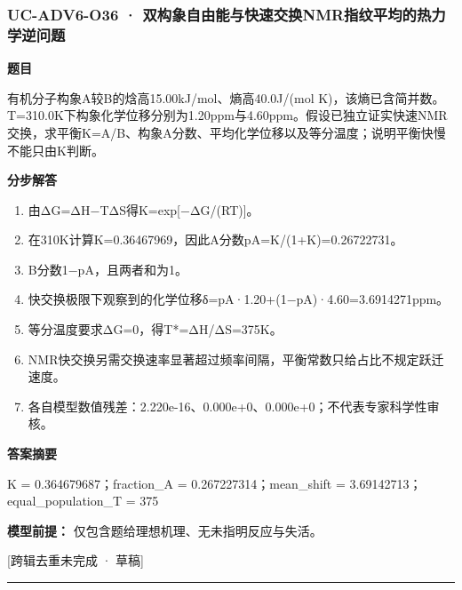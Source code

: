 \documentclass[UTF8,11pt,a4paper]{ctexart}
\begin{document}
\subsubsection*{UC-ADV6-O36 · 双构象自由能与快速交换NMR指纹平均的热力学逆问题}
\noindent\textbf{题目}\par
有机分子构象A较B的焓高15.00kJ/mol、熵高40.0J/(mol K)，该熵已含简并数。T=310.0K下构象化学位移分别为1.20ppm与4.60ppm。假设已独立证实快速NMR交换，求平衡K=A/B、构象A分数、平均化学位移以及等分温度；说明平衡快慢不能只由K判断。\par
\medskip\noindent\textbf{分步解答}
\begin{enumerate}
\item 由ΔG=ΔH−TΔS得K=exp[−ΔG/(RT)]。
\item 在310K计算K=0.36467969，因此A分数pA=K/(1+K)=0.26722731。
\item B分数1−pA，且两者和为1。
\item 快交换极限下观察到的化学位移δ=pA·1.20+(1−pA)·4.60=3.6914271ppm。
\item 等分温度要求ΔG=0，得T*=ΔH/ΔS=375K。
\item NMR快交换另需交换速率显著超过频率间隔，平衡常数只给占比不规定跃迁速度。
\item 各自模型数值残差：2.220e-16、0.000e+0、0.000e+0；不代表专家科学性审核。
\end{enumerate}
\noindent\textbf{答案摘要}\par
K = 0.364679687；fraction\_A = 0.267227314；mean\_shift = 3.69142713；equal\_population\_T = 375\par
\noindent\textbf{模型前提：}
仅包含题给理想机理、无未指明反应与失活。\par
\noindent\textcolor{red!65!black}{[跨辑去重未完成 · 草稿]} \par
\medskip\hrule\medskip
{}
\end{document}
